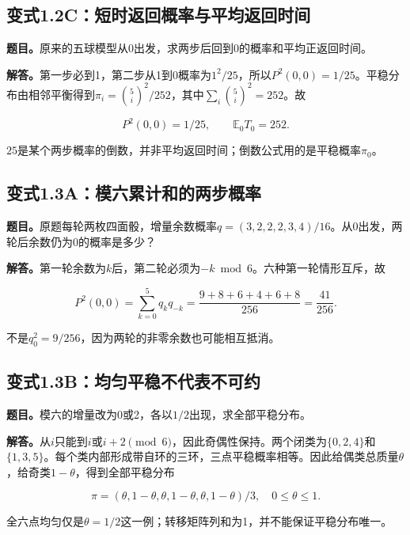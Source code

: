 \documentclass[
  11pt,a4paper,UTF8,fontset=fandol]{ctexart}
\begin{document}
\subsection{变式1.2C：短时返回概率与平均返回时间}\label{ux53d8ux5f0f1.2cux77edux65f6ux8fd4ux56deux6982ux7387ux4e0eux5e73ux5747ux8fd4ux56deux65f6ux95f4}

\textbf{题目。}原来的五球模型从0出发，求两步后回到0的概率和平均正返回时间。

\textbf{解答。}第一步必到1，第二步从1到0概率为\(1^2/25\)，所以\(P^2(0,0)=1/25\)。平稳分布由相邻平衡得到\(\pi_i=\binom5i^2/252\)，其中\(\sum_i\binom5i^2=252\)。故

\[\boxed{P^2(0,0)=1/25,\qquad\mathbb E_0T_0=252.}\]

\(25\)是某个两步概率的倒数，并非平均返回时间；倒数公式用的是平稳概率\(\pi_0\)。

\subsection{变式1.3A：模六累计和的两步概率}\label{ux53d8ux5f0f1.3aux6a21ux516dux7d2fux8ba1ux548cux7684ux4e24ux6b65ux6982ux7387}

\textbf{题目。}原题每轮两枚四面骰，增量余数概率\(q=(3,2,2,2,3,4)/16\)。从0出发，两轮后余数仍为0的概率是多少？

\textbf{解答。}第一轮余数为\(k\)后，第二轮必须为\(-k\bmod6\)。六种第一轮情形互斥，故

\[P^2(0,0)=\sum_{k=0}^5q_kq_{-k}
=\frac{9+8+6+4+6+8}{256}=\boxed{\frac{41}{256}}.\]

不是\(q_0^2=9/256\)，因为两轮的非零余数也可能相互抵消。

\subsection{变式1.3B：均匀平稳不代表不可约}\label{ux53d8ux5f0f1.3bux5747ux5300ux5e73ux7a33ux4e0dux4ee3ux8868ux4e0dux53efux7ea6}

\textbf{题目。}模六的增量改为0或2，各以\(1/2\)出现，求全部平稳分布。

\textbf{解答。}从\(i\)只能到\(i\)或\(i+2\pmod6\)，因此奇偶性保持。两个闭类为\(\{0,2,4\}\)和\(\{1,3,5\}\)。每个类内部形成带自环的三环，三点平稳概率相等。因此给偶类总质量\(\theta\)，给奇类\(1-\theta\)，得到全部平稳分布

\[\boxed{\pi=(\theta,1-\theta,\theta,1-\theta,\theta,1-\theta)/3,
\quad0\le\theta\le1.}\]

全六点均匀仅是\(\theta=1/2\)这一例；转移矩阵列和为1，并不能保证平稳分布唯一。
\end{document}
